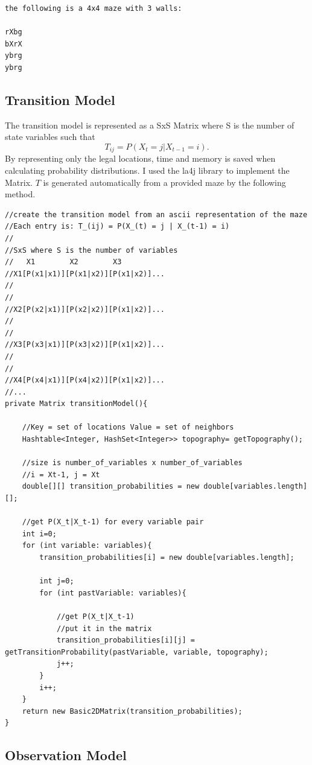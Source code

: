 \documentclass[a4paper]{article}
\begin{document}
\lstset{
numbers=none
}
\begin{lstlisting}
the following is a 4x4 maze with 3 walls:

rXbg
bXrX
ybrg
ybrg
\end{lstlisting}

\subsection{Transition Model}

The transition model is represented as a SxS Matrix where S is the number of state variables such that 
\begin{equation}
T_{ij} = P(X_t = j | X_{t-1} = i).
\end{equation}
By representing only the legal locations, time and memory is saved when calculating probability distributions. I used the la4j library to implement the Matrix. $T$ is generated automatically from a provided maze by the following method.

\lstset{
numbers=left
}
\begin{lstlisting}
//create the transition model from an ascii representation of the maze
//Each entry is: T_(ij) = P(X_(t) = j | X_(t-1) = i)
//
//SxS where S is the number of variables
//   X1        X2        X3
//X1[P(x1|x1)][P(x1|x2)][P(x1|x2)]...
//
//
//X2[P(x2|x1)][P(x2|x2)][P(x1|x2)]...
//
//
//X3[P(x3|x1)][P(x3|x2)][P(x1|x2)]...
//
//
//X4[P(x4|x1)][P(x4|x2)][P(x1|x2)]...
//...
private Matrix transitionModel(){
	
	//Key = set of locations Value = set of neighbors
	Hashtable<Integer, HashSet<Integer>> topography= getTopography();

	//size is number_of_variables x number_of_variables
	//i = Xt-1, j = Xt
	double[][] transition_probabilities = new double[variables.length][];

	//get P(X_t|X_t-1) for every variable pair
	int i=0;
	for (int variable: variables){
		transition_probabilities[i] = new double[variables.length];
		
		int j=0;
		for (int pastVariable: variables){
			
			//get P(X_t|X_t-1)
			//put it in the matrix
			transition_probabilities[i][j] = getTransitionProbability(pastVariable, variable, topography);
			j++;
		}
		i++;
	}
	return new Basic2DMatrix(transition_probabilities);
}
\end{lstlisting}

\subsection{Observation Model}
\end{document}
